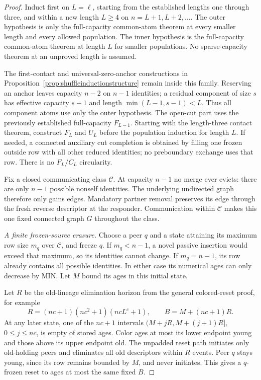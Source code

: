 \documentclass[11pt]{article}
\begin{document}
\begin{proof}
Induct first on $L=\ell$, starting from the established lengths
one through three, and within a new length $L\ge4$ on
$n=L+1,L+2,\ldots$. The outer hypothesis is only the full-capacity common-atom
theorem at every smaller length and every allowed population.
The inner hypothesis is the full-capacity common-atom theorem at length $L$
for smaller populations. No sparse-capacity theorem at an
unproved length is assumed.

The first-contact and universal-zero-anchor constructions in
Proposition~\ref{prop:shuffleinductionstructure} remain inside
this family. Reserving an anchor leaves capacity $n-2$ on
$n-1$ identities; a residual component of size $s$ has effective
capacity $s-1$ and length $\min(L-1,s-1)<L$.
Thus all component atoms use only the outer hypothesis.
The open-cut part uses the previously established full-capacity
$F_{L-1}$. Starting with the length-three contact theorem, construct
$F_L$ and $U_L$ before the population induction for length $L$.
If needed, a connected auxiliary cut completion is obtained by
filling one frozen outside row with all other reduced identities;
no preboundary exchange uses that row. There is no $F_L/C_L$
circularity.

Fix a closed communicating class $\mathcal C$.
At capacity $n-1$ no merge ever evicts: there are only $n-1$
possible nonself identities. The underlying undirected graph
therefore only gains edges. Mandatory partner removal preserves
its edge through the fresh reverse descriptor at the responder.
Communication within $\mathcal C$ makes this one fixed connected
graph $G$ throughout the class.

\emph{A finite frozen-source erasure.}
Choose a peer $q$ and a state attaining its maximum row size
$m_q$ over $\mathcal C$, and freeze $q$. If $m_q<n-1$, a novel
passive insertion would exceed that maximum, so its identities
cannot change. If $m_q=n-1$, its row already contains all possible
identities. In either case its numerical ages can only decrease
by MIN. Let $M$ bound its ages in this initial state.

Let $R$ be the old-lineage elimination horizon from the general
colored-reset proof, for example
\[
 R=(nc+1)(nc^2+1)(ncL^c+1),\qquad B=M+(nc+1)R.
\]
At any later state, one of the $nc+1$ intervals
$(M+jR,M+(j+1)R]$, $0\le j\le nc$, is empty of stored ages.
Color ages at most its lower endpoint young and those above
its upper endpoint old. The unpadded reset path initiates only
old-holding peers and eliminates all old descriptors within $R$
events. Peer $q$ stays young, since its row remains bounded by
$M$, and never initiates. This gives a $q$-frozen reset to ages
at most the same fixed $B$.


\end{proof}
\end{document}

